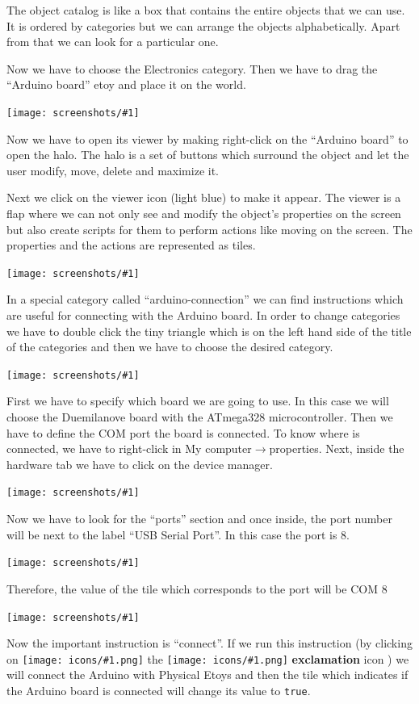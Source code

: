 \documentclass[a4paper,12pt]{article}
\newcommand{\screenshot}[1]
{
\begin{center}
	\texttt{[image: screenshots/\#1]}
\end{center}
}
\newcommand{\code}[1]{\texttt{#1}}
\newcommand{\important}[1]{\textbf{#1}}
\newcommand{\inserticon}[1]
{
\texttt{[image: icons/\#1.png]}
}
\newcommand{\icon}[2][]
{
\ifthenelse {\equal{#1} {}} {\inserticon{#2}} {the \inserticon{#2} \important{#1} icon}
}
\begin{document}
The object catalog is like a box that contains the entire objects that we can use. It is ordered by categories but we can arrange the objects alphabetically. Apart from that we can look for a particular one.

Now we have to choose the Electronics category. Then we have to drag the “Arduino board” etoy and place it on the world.

\screenshot{04.png}
  
Now we have to open its viewer by making right-click on the “Arduino board” to open the halo. The halo is a set of buttons which surround the object and let the user modify, move, delete and maximize it.  

Next we click on the viewer icon (light blue) to make it appear. The viewer is a flap where we can not only see and modify the object’s properties on the screen but also create scripts for them to perform actions like moving on the screen. The properties and the actions are represented as tiles.

\screenshot{05.png}


In a special category called “arduino-connection” we can find instructions which are useful for connecting with the Arduino board. In order to change categories we have to double click the tiny triangle which is on the left hand side of the title of the categories and then we have to choose the desired category. 

\screenshot{06.png}

First we have to specify which board we are going to use.  In this case we will choose the Duemilanove board with the ATmega328 microcontroller. Then we have to define the COM port the board is connected. To know where is connected, we have to right-click in My computer$\rightarrow$properties. Next, inside the hardware tab we have to click on the device manager. 

\screenshot{07.png}

Now we have to look for the “ports” section and once inside, the port number will be next to the label “USB Serial Port”. In this case the port is 8. 
 
\screenshot{08.png}

Therefore, the value of the tile which corresponds to the port will be COM 8

\screenshot{09.png}


Now the important instruction is “connect”. If we run this instruction (by clicking on \icon[exclamation]{exclamation}) we will connect the Arduino with Physical Etoys and then the tile which indicates if the Arduino board is connected will change its value to \code{true}. 
\end{document}
